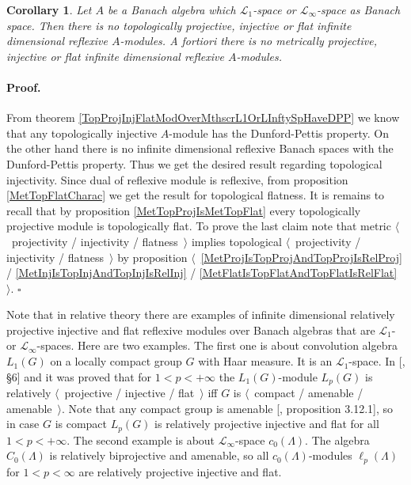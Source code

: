 \documentclass[12pt]{article}
\newtheorem{corollary}[theorem]{Corollary}
\renewenvironment{proof}{\paragraph{Proof.}}{\hfill$\square$\medskip}
\begin{document}
\begin{corollary}\label{NoInfDimRefMetTopProjInjFlatModOverMthscrL1OrLInfty} Let $A$ be a Banach algebra which $\mathscr{L}_1$-space or $\mathscr{L}_\infty$-space as Banach space. Then there is no topologically projective, injective or flat infinite dimensional reflexive $A$-modules. A fortiori there is no metrically projective, injective or flat infinite dimensional reflexive $A$-modules.
\end{corollary}
\begin{proof} From theorem \ref{TopProjInjFlatModOverMthscrL1OrLInftySpHaveDPP} we know that any topologically injective $A$-module has the Dunford-Pettis property. On the other hand there is no infinite dimensional reflexive Banach spaces with the Dunford-Pettis property. Thus we get the desired result regarding topological injectivity. Since dual of reflexive module is reflexive, from proposition \ref{MetTopFlatCharac} we get the result for topological flatness. It is remains to recall that by proposition \ref{MetTopProjIsMetTopFlat}  every topologically projective module is topologically flat. To prove the last claim note that metric $\langle$~projectivity / injectivity / flatness~$\rangle$ implies topological $\langle$~projectivity / injectivity / flatness~$\rangle$ by proposition $\langle$~\ref{MetProjIsTopProjAndTopProjIsRelProj} / \ref{MetInjIsTopInjAndTopInjIsRelInj} / \ref{MetFlatIsTopFlatAndTopFlatIsRelFlat}~$\rangle$.
\end{proof}

Note that in relative theory there are examples of infinite dimensional relatively projective injective and flat reflexive modules over Banach algebras that are $\mathscr{L}_1$- or $\mathscr{L}_\infty$-spaces. Here are two examples. The first one is about convolution algebra $L_1(G)$ on a locally compact group $G$ with Haar measure. It is an $\mathscr{L}_1$-space. In [\cite{DalPolHomolPropGrAlg}, \S6] and \cite{RachInjModAndAmenGr} it was proved that for $1<p<+\infty$ the $L_1(G)$-module $L_p(G)$ is relatively $\langle$~projective / injective / flat~$\rangle$ iff $G$ is $\langle$~compact / amenable / amenable~$\rangle$. Note that any compact group is amenable [\cite{PierAmenLCA}, proposition 3.12.1], so in case $G$ is compact $L_p(G)$ is relatively projective injective and flat for all $1<p<+\infty$.  The second example is about $\mathscr{L}_\infty$-space $c_0(\Lambda)$. The algebra $C_0(\Lambda)$ is relatively biprojective and amenable, so all $c_0(\Lambda)$-modules $\ell_p(\Lambda)$ for $1<p<\infty$ are relatively projective injective and flat. 



\end{document}
